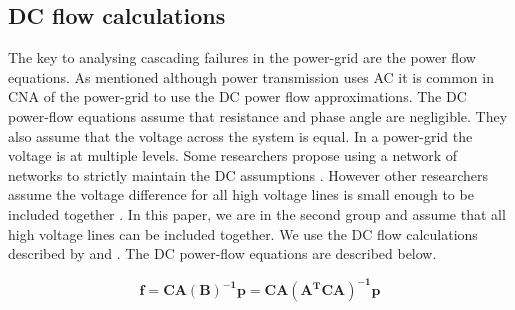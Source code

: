 \subsection{DC flow calculations}
\label{sect:DCeqs}
The key to analysing cascading failures in the power-grid are the power flow equations. As mentioned although power transmission uses AC it is common in CNA of the power-grid to use the DC power flow approximations. The DC power-flow equations assume that resistance and phase angle are negligible. They also assume that the voltage across the system is equal. In a power-grid the voltage is at multiple levels. Some researchers propose using a network of networks to strictly maintain the DC assumptions \cite{HalappanavarANetworks}. However other researchers assume the voltage difference for all high voltage lines is small enough to be included together \cite{Rosas-Casals2007TOPOLOGICALATTACKS}.   In this paper, we are in the second group and assume that all high voltage lines can be included together.
We use the DC flow calculations described by \cite{Pepyne2007TopologyGrids} and \cite{Arianos2008PowerApproach}. The DC power-flow equations are described below.

\begin{equation}
\label{eq:powerflowTheory}
    \mathbf{f}= \mathbf{CA(B)^{-1}p}=\mathbf{CA(A^TCA)^{-1}p}
\end{equation}

